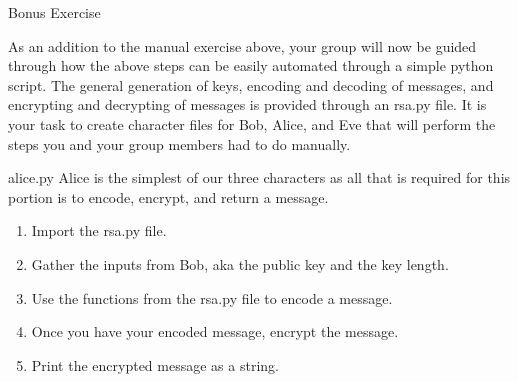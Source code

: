 \documentclass{article}
\begin{document}
    \newpage
    \huge Bonus Exercise
    \normalsize

    As an addition to the manual exercise above, your group will now be guided through how the above steps can be easily automated through a simple python script.
    The general generation of keys, encoding and decoding of messages, and encrypting and decrypting of messages is provided through an rsa.py file. It is your task to create character files for Bob, Alice, and Eve that will perform the steps you and your group members had to do manually.

    alice.py
    Alice is the simplest of our three characters as all that is required for this portion is to encode, encrypt, and return a message.

    \begin{enumerate}
        \item Import the rsa.py file.

            \TextField[width=6in,height=1in]{}

        \item Gather the inputs from Bob, aka the public key and the key length.
            
            \TextField[width=6in,height=1in]{}

        \item Use the functions from the rsa.py file to encode a message.

        \TextField[width=6in,height=1in]{}

        \item Once you have your encoded message, encrypt the message.

        \TextField[width=6in,height=1in]{}

        \item Print the encrypted message as a string.

        \TextField[width=6in,height=1in]{}

    \end{enumerate}
\end{document}
